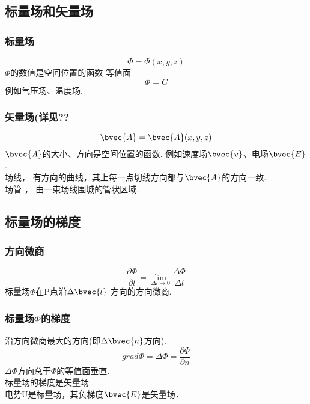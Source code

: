 
\subsection{标量场和矢量场}
\subsubsection{标量场}
\begin{equation}\label{VecAnl_eq1}
\Phi=\Phi(x,y,z)
\end{equation}
 $\Phi$的数值是空间位置的函数
 等值面
\begin{equation}\label{VecAnl_eq2}
\Phi=C
\end{equation}
 例如气压场、温度场.
\subsubsection{矢量场(详见??}%
\begin{equation}\label{VecAnl_eq3}
\bvec {A}= \bvec{A}(x,y,z)
\end{equation}
$\bvec{A}$的大小、方向是空间位置的函数.
例如速度场$\bvec{v}$、电场$\bvec{E}$.\\
\qquad 场线，
 有方向的曲线，其上每一点切线方向都与$\bvec{A}$的方向一致.\\
\qquad 场管 ，
由一束场线围城的管状区域.

\subsection{标量场的梯度}%
\subsubsection{方向微商}
\begin{equation}\label{VecAnl_eq4}
\frac{\partial \Phi}{\partial l}=\lim_{\Delta l \to 0}\frac{\Delta \Phi}{\Delta l}
\end{equation}
标量场$\Phi$在P点沿$\Delta \bvec{l} $ 方向的方向微商.

\subsubsection{标量场$\Phi$的梯度}
沿方向微商最大的方向(即$\Delta \bvec{n}$方向).
\begin{equation}\label{VecAnl_eq5}
grad \Phi = \Delta \Phi =\frac{\partial \Phi}{\partial n}
\end{equation}
$\Delta \Phi$方向总于$\Phi$的等值面垂直.\\
标量场的梯度是矢量场\\
电势U是标量场，其负梯度$\bvec{E}$是矢量场．

